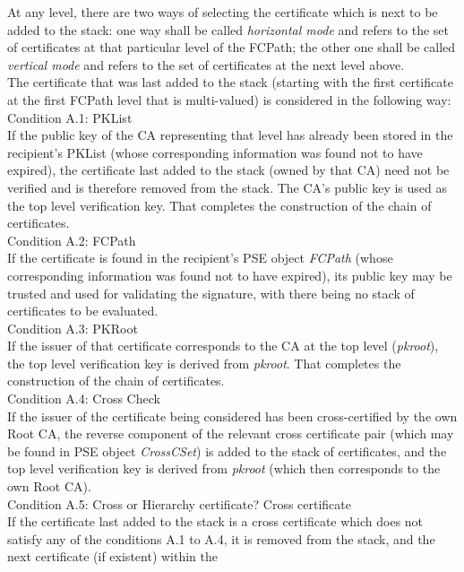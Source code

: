 At any level, there are two ways of selecting the certificate which is next to be 
added to the stack: one way shall be called {\em horizontal mode} and refers to the 
set of certificates at that particular level of the FCPath; the other one shall be 
called {\em vertical mode} and refers to the set of certificates at the next level 
above. \\
The certificate that was last added to the stack (starting with the first certificate 
at the first FCPath level that is multi-valued) is considered in the 
following way:
\\ [1em]
Condition A.1: PKList \\
If the public key of the CA representing that level has already been stored in 
the recipient's PKList (whose corresponding information was found not to have expired),
the certificate last added to the stack (owned by that CA) need not be verified 
and is therefore removed from the stack. The CA's public key is used as the 
top level verification key. That completes the construction of the chain of
certificates.
\\ [1em]
Condition A.2: FCPath \\
If the certificate is found in the recipient's PSE object {\em FCPath} (whose corresponding 
information was found not to have expired), its public
key may be trusted and used for validating the signature, with there being no stack of 
certificates to be evaluated.
\\ [1em]
Condition A.3: PKRoot \\
If the issuer of that certificate corresponds to the CA at the top level
({\em pkroot}), the top level verification key is derived from {\em pkroot}.
That completes the construction of the chain of certificates.
\\ [1em]
Condition A.4: Cross Check \\
If the issuer of the certificate being considered has been cross-certified by the own Root CA, the 
reverse component of the relevant cross certificate pair (which may be found in PSE
object {\em CrossCSet}) is added to the stack of certificates, 
and the top level verification key is derived from {\em pkroot} (which then corresponds
to the own Root CA).
\\ [1em]
Condition A.5: Cross or Hierarchy certificate? 
\bi
\m Cross certificate \\
If the certificate last added to the stack is
a cross certificate which does not satisfy any of the conditions A.1 to A.4,
it is removed from the stack, and the next certificate (if existent) within the 
